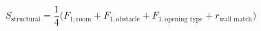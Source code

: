 \documentclass[12pt]{article}
\begin{document}
\begin{equation*}
S_{\text{structural}} = \frac{1}{4}\bigl(F_{1,\text{room}} + F_{1,\text{obstacle}} + F_{1,\text{opening type}} + r_{\text{wall match}}\bigr)
\end{equation*}
\end{document}
